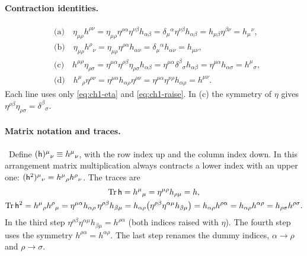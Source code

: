 \paragraph{Contraction identities.} \tD
\begin{equation}
\begin{aligned}
&\text{(a)}\quad \eta_{\mu\rho}h^{\rho\nu}=\eta_{\mu\rho}\eta^{\rho\alpha}\eta^{\nu\beta}h_{\alpha\beta}=\delta_\mu{}^\alpha\eta^{\nu\beta}h_{\alpha\beta}=h_{\mu\beta}\eta^{\beta\nu}=h_\mu{}^\nu,\\[2pt]
&\text{(b)}\quad \eta_{\mu\rho}h^\rho{}_\nu=\eta_{\mu\rho}\eta^{\rho\alpha}h_{\alpha\nu}=\delta_\mu{}^\alpha h_{\alpha\nu}=h_{\mu\nu},\\[2pt]
&\text{(c)}\quad h^{\mu\rho}\eta_{\rho\sigma}=\eta^{\mu\alpha}\eta^{\rho\beta}\eta_{\rho\sigma}h_{\alpha\beta}=\eta^{\mu\alpha}\delta^\beta{}_\sigma h_{\alpha\beta}=\eta^{\mu\alpha}h_{\alpha\sigma}=h^\mu{}_\sigma,\\[2pt]
&\text{(d)}\quad h^\mu{}_\rho\eta^{\rho\nu}=\eta^{\mu\alpha}h_{\alpha\rho}\eta^{\rho\nu}=\eta^{\mu\alpha}\eta^{\nu\rho}h_{\alpha\rho}=h^{\mu\nu}.
\end{aligned}
\label{eq:ch1-contr}
\end{equation}
Each line uses only \eqref{eq:ch1-eta} and \eqref{eq:ch1-raise}. In (c) the
symmetry of $\eta$ gives $\eta^{\rho\beta}\eta_{\rho\sigma}=\delta^\beta{}_\sigma$.

\paragraph{Matrix notation and traces.} \tD\ Define
$(\mathsf{h})^\mu{}_\nu\equiv h^\mu{}_\nu$, with the row index up and the column index
down. In this arrangement matrix multiplication always contracts a lower index
with an upper one: $(\mathsf{h}^2)^\mu{}_\nu=h^\mu{}_\rho h^\rho{}_\nu$. The traces are
\begin{gather}
\operatorname{Tr}\mathsf{h}=h^\mu{}_\mu=\eta^{\mu\rho}h_{\rho\mu}=h, \label{eq:ch1-tr1}\\
\operatorname{Tr}\mathsf{h}^2=h^\mu{}_\rho h^\rho{}_\mu
=\eta^{\mu\alpha}h_{\alpha\rho}\,\eta^{\rho\beta}h_{\beta\mu}
=h_{\alpha\rho}\big(\eta^{\rho\beta}\eta^{\alpha\mu}h_{\beta\mu}\big)
=h_{\alpha\rho}h^{\rho\alpha}
=h_{\alpha\rho}h^{\alpha\rho}
=h_{\rho\sigma}h^{\rho\sigma}. \label{eq:ch1-tr2}
\end{gather}
In the third step $\eta^{\rho\beta}\eta^{\alpha\mu}h_{\beta\mu}=h^{\rho\alpha}$
(both indices raised with $\eta$). The fourth step uses the symmetry
$h^{\rho\alpha}=h^{\alpha\rho}$. The last step renames the dummy indices,
$\alpha\to\rho$ and $\rho\to\sigma$.

